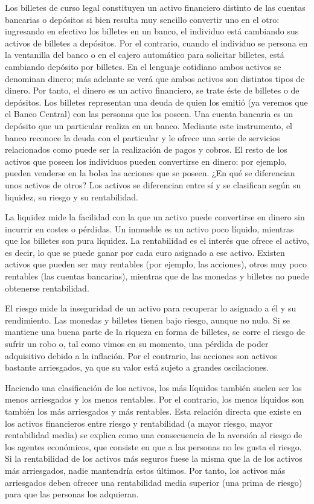 \documentclass[
]{krantz}
\begin{document}
Los billetes de curso legal constituyen un activo financiero distinto de las cuentas bancarias o depósitos si bien resulta muy sencillo convertir uno en el otro: ingresando en efectivo los billetes en un banco, el individuo está cambiando sus activos de billetes a depósitos. Por el contrario, cuando el individuo se persona en la ventanilla del banco o en el cajero automático para solicitar billetes, está cambiando depósito por billetes. En el lenguaje cotidiano ambos activos se denominan dinero; más adelante se verá que ambos activos son distintos tipos de dinero. Por tanto, el dinero es un activo financiero, se trate éste de billetes o de depósitos. Los billetes representan una deuda de quien los emitió (ya veremos que el Banco Central) con las personas que los poseen. Una cuenta bancaria es un depósito que un particular realiza en un banco. Mediante este instrumento, el banco reconoce la deuda con el particular y le ofrece una serie de servicios relacionados como puede ser la realización de pagos y cobros. El resto de los activos que poseen los individuos pueden convertirse en dinero: por ejemplo, pueden venderse en la bolsa las acciones que se poseen. ¿En qué se diferencian unos activos de otros? Los activos se diferencian entre sí y se clasifican según su liquidez, su riesgo y su rentabilidad.

La liquidez mide la facilidad con la que un activo puede convertirse en dinero sin incurrir en costes o pérdidas. Un inmueble es un activo poco líquido, mientras que los billetes son pura liquidez. La rentabilidad es el interés que ofrece el activo, es decir, lo que se puede ganar por cada euro asignado a ese activo. Existen activos que pueden ser muy rentables (por ejemplo, las acciones), otros muy poco rentables (las cuentas bancarias), mientras que de las monedas y billetes no puede obtenerse rentabilidad.

El riesgo mide la inseguridad de un activo para recuperar lo asignado a él y su rendimiento. Las monedas y billetes tienen bajo riesgo, aunque no nulo. Si se mantiene una buena parte de la riqueza en forma de billetes, se corre el riesgo de sufrir un robo o, tal como vimos en su momento, una pérdida de poder adquisitivo debido a la inflación. Por el contrario, las acciones son activos bastante arriesgados, ya que su valor está sujeto a grandes oscilaciones.

Haciendo una clasificación de los activos, los más líquidos también suelen ser los menos arriesgados y los menos rentables. Por el contrario, los menos líquidos son también los más arriesgados y más rentables. Esta relación directa que existe en los activos financieros entre riesgo y rentabilidad (a mayor riesgo, mayor rentabilidad media) se explica como una consecuencia de la aversión al riesgo de los agentes económicos, que consiste en que a las personas no les gusta el riesgo. Si la rentabilidad de los activos más seguros fuese la misma que la de los activos más arriesgados, nadie mantendría estos últimos. Por tanto, los activos más arriesgados deben ofrecer una rentabilidad media superior (una prima de riesgo) para que las personas los adquieran.
\end{document}
